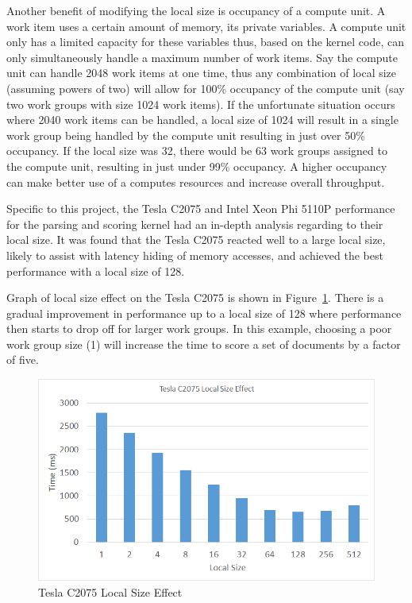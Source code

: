 Another benefit of modifying the local size is occupancy of a compute unit. A
work item uses a certain amount of memory, its private variables. A compute unit
only has a limited capacity for these variables thus, based on the kernel code,
can only simultaneously handle a maximum number of work items. Say the compute
unit can handle 2048 work items at one time, thus any combination of local size
(assuming powers of two) will allow for 100\% occupancy of the compute unit (say
two work groups with size 1024 work items). If the unfortunate situation occurs
where 2040 work items can be handled, a local size of 1024 will result in a
single work group being handled by the compute unit resulting in just over 50\%
occupancy. If the local size was 32, there would be 63 work groups assigned to
the compute unit, resulting in just under 99\% occupancy. A higher occupancy can
make better use of a computes resources and increase overall throughput.

Specific to this project, the Tesla C2075 and Intel Xeon Phi 5110P performance
for the parsing and scoring kernel had an in-depth analysis regarding to their
local size. It was found that the Tesla C2075 reacted well to a large local
size, likely to assist with latency hiding of memory accesses, and achieved the
best performance with a local size of 128.

Graph of local size effect on the Tesla C2075 is shown in
Figure~\ref{fig:teslaLocalSize}. There is a gradual improvement in performance
up to a local size of 128 where performance then starts to drop off for larger
work groups. In this example, choosing a poor work group size (1) will increase
the time to score a set of documents by a factor of five.

\begin{figure}[H]
\includegraphics[width=\linewidth]{images/teslaLocalSize.png}
\caption{Tesla C2075 Local Size Effect}
\label{fig:teslaLocalSize}
\end{figure}

